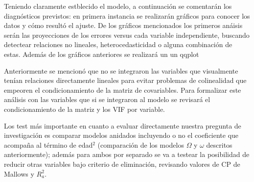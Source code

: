 

Teniendo claramente estblecido el modelo, a continuación se comentarán los diagnósticos previstos: en primera instancia se realizarán gráficos para conocer los datos y cómo resultó el ajuste. De los gráficos mencionados los primeros anáisis serán las proyecciones de los errores versus cada variable independiente, buscando detectear relaciones no lineales, heterocedasticidad o alguna combinación de estas. Además de los gráficos anteriores se realizará un un qqplot

Anteriormente se mencionó que no se integraron las variables que visualmente tenían relaciones directamente lineales para evitar problemas de colinealidad que empeoren el condicionamiento de la matriz de covariables. Para formalizar este análisis con las variables que si se integraron al modelo se revisará el condicionamiento de la matriz y los VIF por variable.

Los test más importante en cuanto a evaluar directamente nuestra pregunta de investigación es comparar modelos anidados incluyendo o no el coeficiente que acompaña al término de edad$^2$ (comparación de los modelos $\Omega$ y $\omega$ descritos anteriormente); además para ambos por separado se va a testear la posibilidad de reducir otras variables bajo criterio de eliminación, revisando valores de CP de Mallows y $R^2_a$.




